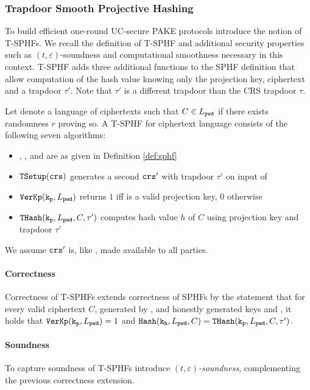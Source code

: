 \subsubsection{Trapdoor Smooth Projective Hashing}\label{sec:tsphf}
To build efficient one-round UC-secure PAKE protocols \citet{Benhamouda2013} introduce the notion of \acp{T-SPHF}.
We recall the definition of \ac{T-SPHF} and additional security properties such as $(t,\varepsilon)$-soundness and computational smoothness necessary in this context.
\ac{T-SPHF} adds three additional functions to the \ac{SPHF} definition that allow computation of the hash value knowing only the projection key, ciphertext and a trapdoor $\tau'$.
Note that $\tau'$ is a different trapdoor than the \ac{CRS} trapdoor $\tau$.

\begin{definition}\label{def:tsphf}
Let \Lpwd denote a language of ciphertexts such that $C\in L_\mathtt{pwd}$ if there exists randomness $r$ proving so.
A \acl{T-SPHF} for ciphertext language \Lpwd consists of the following seven algorithms:

\begin{itemize}
  \item \HKGen, \PKGen, \Hash and \ProjHash are as given in Definition \ref{def:sphf}
	\item $\mathtt{TSetup}(\mathtt{crs})$ generates a second $\mathtt{crs}'$ with trapdoor $\tau'$ on input of \crs
	\item $\mathtt{VerKp}(\mathtt{k_p}, L_\mathtt{pwd})$ returns $1$ iff \hp is a valid projection key, $0$ otherwise
	\item $\mathtt{THash}(\mathtt{k_p}, L_\mathtt{pwd}, C, \tau')$ computes hash value $h$ of $C$ using  projection key \hp and trapdoor $\tau'$
\end{itemize}

\noindent
We assume $\mathtt{crs}'$ is, like \crs, made available to all parties.
\eod
\end{definition}

\paragraph{Correctness} Correctness of \acp{T-SPHF} extends correctness of \acp{SPHF} by the statement that for every valid ciphertext $C$, generated by \cL, and honestly generated keys \hk and \hp, it holds that $\mathtt{VerKp}(\mathtt{k_p}, L_\mathtt{pwd})=1$ and $\mathtt{Hash}(\mathtt{k_h}, L_\mathtt{pwd}, C)=\mathtt{THash}(\mathtt{k_p}, L_\mathtt{pwd}, C, \tau')$.

\paragraph{Soundness}
To capture soundness of \acp{T-SPHF} \citet{Benhamouda2013} introduce \emph{$(t,\varepsilon)$-soundness}, complementing the previous correctness extension.

